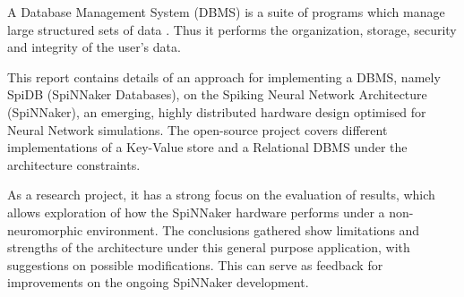 { \par}
\vspace{5mm}
A Database Management System (DBMS) is a suite of programs which manage large structured sets of data \cite{dbmsdef}. Thus it performs the organization, storage, security and integrity of the user's data.

This report contains details of an approach for implementing a DBMS, namely SpiDB (SpiNNaker Databases), on the Spiking Neural Network Architecture (SpiNNaker), an emerging, highly distributed hardware design optimised for Neural Network simulations. The open-source project covers different implementations of a Key-Value store and a Relational DBMS under the architecture constraints.

As a research project, it has a strong focus on the evaluation of results, which allows exploration of how the SpiNNaker hardware performs under a non-neuromorphic environment. The conclusions gathered show limitations and strengths of the architecture under this general purpose application, with suggestions on possible modifications. This can serve as feedback for improvements on the ongoing SpiNNaker development.